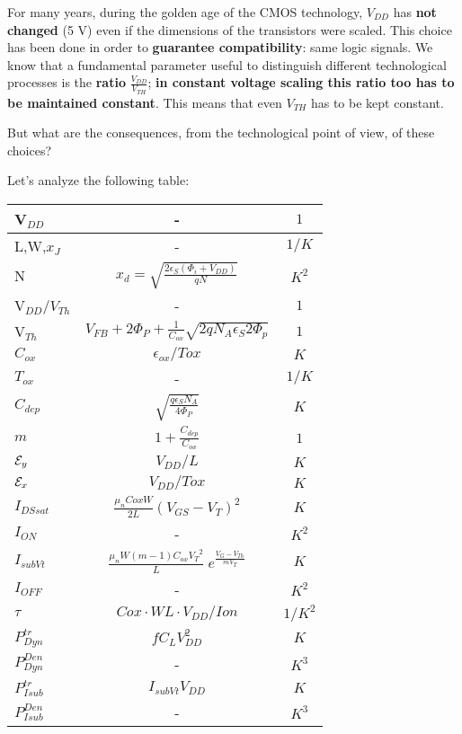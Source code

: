 \documentclass[a4paper, 12pt, twoside, openright]{report}
\begin{document}
For many years, during the golden age of the CMOS technology, $V_{DD}$ has \textbf{not changed} (5 V) even if the dimensions of the transistors were scaled. This choice has been done in order to \textbf{guarantee compatibility}: same logic signals. We know that a fundamental parameter useful to distinguish different technological processes is the \textbf{ratio} $\frac{V_{DD}}{V_{TH}}$; \textbf{in constant voltage scaling this ratio too has to be maintained constant}. This means that even $V_{TH}$ has to be kept constant.

But what are the consequences, from the technological point of view, of these choices?

Let's analyze the following table:

 \begin{table}[H]
 \begin{center}
 {
  {
     \begin{tabular}{||l||c|c||}\hline
      V$_{DD}$ & -& $ {1}$\\
      \hline
      L,W,$x_J$       &- & $ {1/K}$\\
      \hline
      N & $x_d=\sqrt{\frac{2\epsilon_S(\Phi_i+V_{DD})}{qN}}$&$ {K^2}$ \\
      \hline
      V$_{DD}/V_{Th}$ &- & ${1}$\\
      \hline
      V$_{Th}$ & $V_{FB}+2\Phi_P+\frac{1}{C_{ox}}\sqrt{2qN_A\epsilon_S 2\Phi_p}$& $ {1}$\\
      \hline
       $C_{ox}$&  $\epsilon_{ox}/Tox$ &$ {K}$\\ 
      \hline
      $T_{ox}$       &- & $ {1/K}$\\
      \hline
       $C_{dep}$&  $\sqrt{\frac{q\epsilon_SN_A}{4\Phi_P}}$ & ${K}$\\
      \hline
       $m$&  $1 +\frac{C_{dep}}{C_{ox}}$ &$ {1}$\\ 
      \hline
      ${\cal E}_y$ & $V_{DD}/L$ & $ {K}$\\
      \hline
      ${\cal E}_x$ & $V_{DD}/Tox$ & $ {K}$\\
      \hline
      $I_{DSsat}$      &$\frac{\mu_n Cox W}{2L}(V_{GS}-V_T)^2$ &$ {K}$\\ 
      \hline  
       $I_{ON}$      &- &$ {K}^2$\\ 
      \hline
       $I_{subVt}$      &$\frac{\mu_n W \left(m-1 \right) C_{ox} {V_T}^2}{L}\;
            e^{\displaystyle \frac{ {V_G-V_{Th}}}{ mV_T}}$ &$ {K}$\\ 
      \hline  
       $I_{OFF}$      &- &$ {K}^2$\\ 
      \hline
      $\tau$     &$Cox\cdot WL\cdot V_{DD}/Ion$ &$ {1/K^2}$\\ 
      \hline 
      $P_{Dyn}^{tr}$      &$fC_LV_{DD}^2$  &$ {K}$\\ 
      \hline 
      $P_{Dyn}^{Den}$      &-&$ {K^3}$\\ 
      \hline
       $P_{Isub}^{tr}$      &$I_{subVt}V_{DD}$  &$ {K}$\\ 
      \hline 
       $P_{Isub}^{Den}$      &-&$ {K^3}$\\ 
      \hline
     \end{tabular}
     }
    }
    \end{center}
    \end{table}
\end{document}
